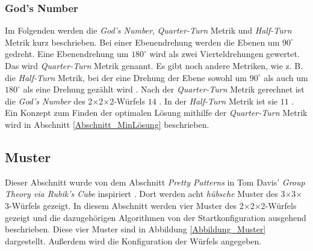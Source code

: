 \documentclass[12pt,a4paper, usenames, dvipsnames]{article}
\theoremstyle{mystyle}
\theoremstyle{definition}
\newcommand{\Ttwo}{2$\times$2$\times$2-}
\newcommand{\Tthree}{3$\times$3$\times$3-}
\begin{document}
\subsubsection*{God's Number}
Im Folgenden werden die \textit{God's Number}, \textit{Quarter-Turn} Metrik und \textit{Half-Turn} Metrik kurz beschrieben.
Bei einer Ebenendrehung werden die Ebenen um $90^\circ$ gedreht. Eine Ebenendrehung um $180^\circ$ wird als zwei Vierteldrehungen gewertet. Das wird \textit{Quarter-Turn} Metrik genannt. Es gibt noch andere Metriken, wie z. B. die \textit{Half-Turn} Metrik, bei der eine Drehung der Ebene sowohl um $90^\circ$ als auch um $180^\circ$ als eine Drehung gezählt wird \cite{TR}.
Nach der \textit{Quarter-Turn} Metrik gerechnet ist die \textit{God's Number} des \Ttwo Würfels $14$ \cite{DJ}. In der \textit{Half-Turn} Metrik ist sie $11$ \cite{RMG}.
Ein Konzept zum Finden der optimalen Lösung mithilfe der \textit{Quarter-Turn} Metrik wird in Abschnitt \ref{Abschnitt_MinLösung} beschrieben.


%
%
%
%
%
%
%
%
%
%
%
%
%
%
%
%
%
%
%
\subsection{Muster}

Dieser Abschnitt wurde von dem Abschnitt \textit{Pretty Patterns} in Tom Davis' \textit{Group Theory via Rubik's Cube} inspiriert \cite{TD}.
Dort werden acht \textit{hübsche} Muster des \Tthree Würfels gezeigt. In diesem Abschnitt werden vier Muster des \Ttwo Würfels gezeigt und die dazugehörigen Algorithmen von der Startkonfiguration ausgehend beschrieben. Diese vier Muster sind in Abbildung \ref{Abbildung_Muster} dargestellt.
Außerdem wird die Konfiguration der Würfels angegeben.
\end{document}
